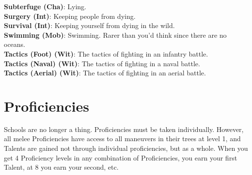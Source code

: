 \documentclass[a4paper, twocolumn, openany]{book}
\begin{document}
{{\bfseries Subterfuge (Cha)}: Lying.\\
{\bfseries Surgery (Int)}: Keeping people from dying.\\
{\bfseries Survival (Int)}: Keeping yourself from dying in the wild.\\
{\bfseries Swimming (Mob)}: Swimming. Rarer than you’d think since there are no oceans.\\
{\bfseries Tactics (Foot) (Wit)}: The tactics of fighting in an infantry battle.\\
{\bfseries Tactics (Naval) (Wit)}: The tactics of fighting in a naval battle.\\
{\bfseries Tactics (Aerial) (Wit)}: The tactics of fighting in an aerial battle.\\

\section{Proficiencies}
Schools are no longer a thing. Proficiencies must be taken individually. However, all melee
Proficiencies have access to all maneuvers in their trees at level 1, and Talents are gained not
through individual proficiencies, but as a whole. When you get 4 Proficiency levels in any
combination of Proficiencies, you earn your first Talent, at 8 you earn your second, etc.\\

}
\end{document}
